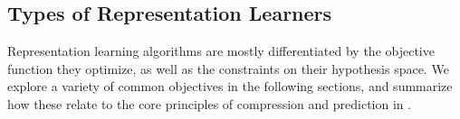 


\subsection{Types of Representation Learners}

Representation learning algorithms are mostly differentiated by the objective function they optimize, as well as the constraints on their hypothesis space. We explore a variety of common objectives in the following sections, and summarize how these relate to the core principles of compression and prediction in \tab{\ref{tab:representation_learning:types_of_representation_learners}}.

